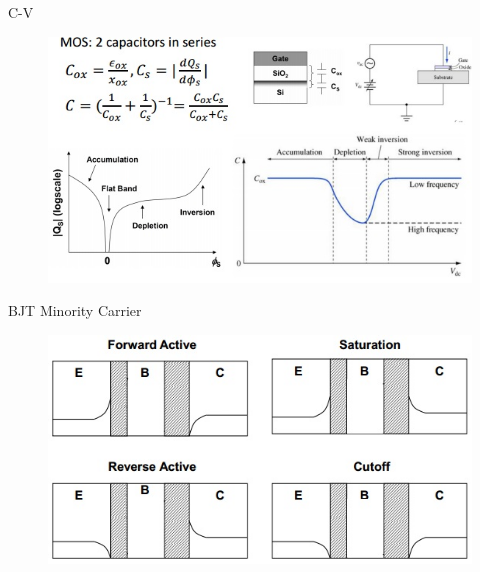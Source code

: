 \documentclass[11pt,landscape]{article}
\begin{document}
\begin{multicols}{3}
C-V
\begin{figure}[H]
    \includegraphics[scale=0.53]{./Images/3/8.jpg}
\end{figure}

BJT Minority Carrier
\begin{figure}[H]
    \includegraphics[scale=0.58]{./Images/3/9.jpg}
\end{figure}


\end{multicols}
\end{document}

